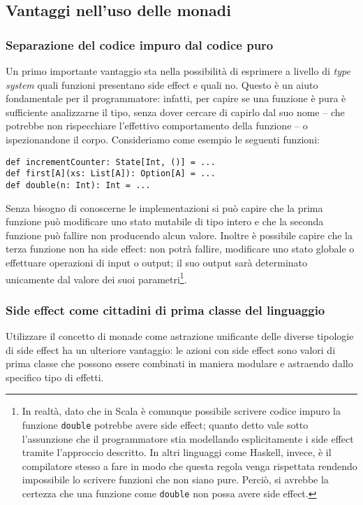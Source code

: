 \subsection{Vantaggi nell'uso delle monadi}
\subsubsection{Separazione del codice impuro dal codice puro}
Un primo importante vantaggio sta nella possibilità di esprimere a livello di \emph{type system} quali funzioni presentano side effect e quali no. Questo è un aiuto fondamentale per il programmatore: infatti, per capire se una funzione è pura è sufficiente analizzarne il tipo, senza dover cercare di capirlo dal suo nome -- che potrebbe non rispecchiare l'effettivo comportamento della funzione -- o ispezionandone il corpo.
Consideriamo come esempio le seguenti funzioni:
\begin{lstlisting}[language=scala3]
def incrementCounter: State[Int, ()] = ...
def first[A](xs: List[A]): Option[A] = ...
def double(n: Int): Int = ...
\end{lstlisting}
Senza bisogno di conoscerne le implementazioni si può capire che la prima funzione può modificare uno stato mutabile di tipo intero e che la seconda funzione può fallire non producendo alcun valore. Inoltre è possibile capire che la terza funzione non ha side effect: non potrà fallire, modificare uno stato globale o effettuare operazioni di input o output; il suo output sarà determinato unicamente dal valore dei suoi parametri\footnote{In realtà, dato che in Scala è comunque possibile scrivere codice impuro la funzione \lstinline{double} potrebbe avere side effect; quanto detto vale sotto l'assunzione che il programmatore stia modellando esplicitamente i side effect tramite l'approccio descritto. In altri linguaggi come Haskell, invece, è il compilatore stesso a fare in modo che questa regola venga rispettata rendendo impossibile lo scrivere funzioni che non siano pure. Perciò, si avrebbe la certezza che una funzione come \lstinline{double} non possa avere side effect.}.

\subsubsection{Side effect come cittadini di prima classe del linguaggio}
Utilizzare il concetto di monade come astrazione unificante delle diverse tipologie di side effect ha un ulteriore vantaggio: le azioni con side effect sono valori di prima classe che possono essere combinati in maniera modulare e astraendo dallo specifico tipo di effetti.

